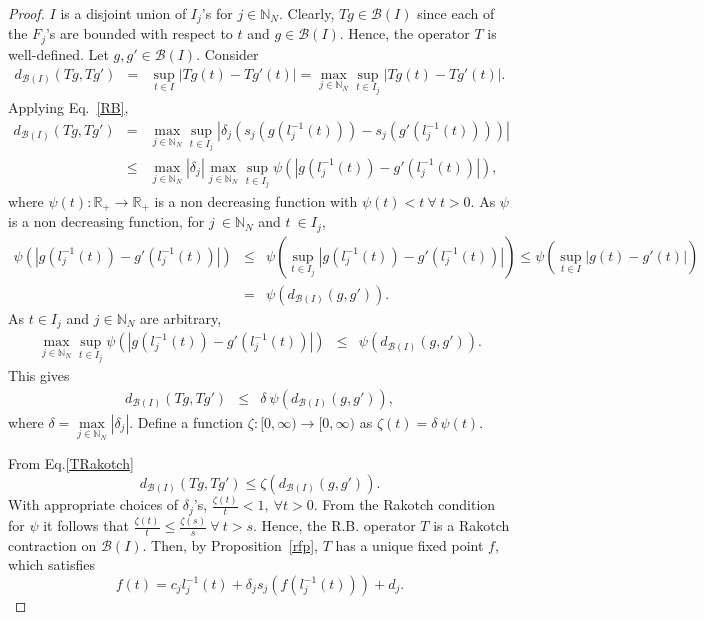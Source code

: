 \documentclass[sn-mathphys-num]{sn-jnl}
\numberwithin{equation}{section}
\begin{document}
\begin{proof}
$I$ is a disjoint union of $I_j$'s for $j\in\mathbb N_N$.
Clearly, $Tg\in\mathcal{B}(I)$ since each of the $F_j$'s are bounded with respect to $t$ and $g\in\mathcal{B}(I)$. Hence, the operator $T$ is well-defined. Let $g,g'\in\mathcal{B}(I)$. Consider
\begin{eqnarray*}
d_{\mathcal{B}(I)}(Tg,Tg')&=&\sup\limits_{t\in I}|Tg(t)-Tg'(t)|=\max\limits_{j\in \mathbb{N}_N}\sup\limits_{t\in I_j}|Tg(t)-Tg'(t)|.
\end{eqnarray*}
Applying Eq.~\eqref{RB},
\begin{eqnarray*}
d_{\mathcal{B}(I)}(Tg,Tg')&=&\max\limits_{j\in \mathbb{N}_N}\sup\limits_{t\in I_j}|\delta_j(s_j(g(l_j^{-1}(t)))-s_j(g'(l_j^{-1}(t))))|\\
&\leq&\max\limits_{j\in \mathbb{N}_N}|\delta_j|\max\limits_{j\in \mathbb{N}_N}  \sup_{t\in I_j}\psi(|g(l_j^{-1}(t))-g'(l_j^{-1}(t))|),
\end{eqnarray*}
where $\psi(t):\mathbb{R}_{+}\rightarrow\mathbb{R}_{+}$ is a non decreasing function with $\psi(t) < t\ \forall \  t>0$. As $\psi$ is a non decreasing function, for $j\ \in \mathbb N_N$ and $t\ \in I_{j}$,
\begin{eqnarray*}
\psi(|g(l_{j}^{-1}(t))-g'(l_{j}^{-1}(t))|)&\leq&\psi(\sup_{t\in I_{j}}|g(l_{j}^{-1}(t))-g'(l_{j}^{-1}(t))|)\leq\psi(\sup_{t\in I}|g(t)-g'(t)|)\\
&=&\psi(d_{\mathcal{B}(I)}(g,g')).
\end{eqnarray*}
As $t\in I_{j}$ and $j\in\mathbb N_N$ are arbitrary,
\begin{eqnarray*}
\max\limits_{j\in \mathbb N_N}\sup_{t\in I_j}\psi(|g(l_j^{-1}(t))-g'(l_j^{-1}(t))|)&\leq&\psi(d_{\mathcal{B}(I)}(g,g')).
\end{eqnarray*}
This gives
\begin{eqnarray}
d_{\mathcal{B}(I)}(Tg,Tg')&\leq&\delta~\psi(d_{\mathcal{B}(I)}(g,g')),\label{TRakotch}
\end{eqnarray}
where $\delta=\max\limits_{j\in \mathbb{N}_N}|\delta_j|$. Define a function $\zeta:[0,\infty)\rightarrow[0,\infty)$ as $\zeta(t)=\delta~\psi(t)$.

\noindent From Eq.\eqref{TRakotch}
$$d_{\mathcal{B}(I)}(Tg,Tg')\leq \zeta(d_{\mathcal{B}(I)}(g,g')).$$ With appropriate choices of $\delta_j$'s, $\frac{\zeta(t)}{t}<1, ~\forall t>0$. From the Rakotch condition for $\psi$ it follows that $\frac{\zeta(t)}{t}\leq\frac{\zeta(s)}{s} ~\forall~t>s$. 
Hence, the R.B. operator $T$ is a Rakotch contraction on $\mathcal{B}(I)$. Then, by Proposition~\ref{rfp}, $T$ has a unique fixed point $f$, which satisfies
\begin{equation*}
f(t)=c_jl_j^{-1}(t)+\delta_js_j(f(l_j^{-1}(t)))+d_j.
\end{equation*}
\end{proof}
\end{document}
